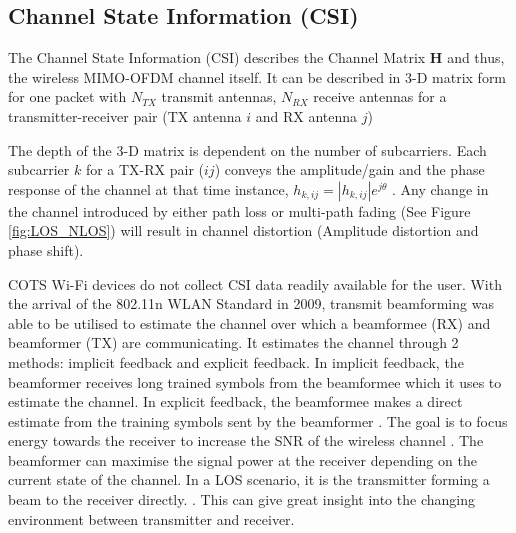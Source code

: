 \subsection{Channel State Information (CSI)}
The Channel State Information (CSI) describes the Channel Matrix \textbf{H} and thus, the wireless MIMO-OFDM channel itself. It can be described in 3-D matrix form for one packet with $N_{TX}$ transmit antennas, $N_{RX}$ receive antennas for a transmitter-receiver pair (TX antenna $i$ and RX antenna $j$) \par
The depth of the 3-D matrix is dependent on the number of subcarriers. Each subcarrier $k$ for a TX-RX pair ($ij$) conveys the amplitude/gain and the phase response of the channel at that time instance, $h_{k,ij} = |h_{k,ij}|e^{j\theta}$ \citep{OFDM}. Any change in the channel introduced by either path loss or multi-path fading (See Figure \ref{fig:LOS_NLOS}) will result in channel distortion (Amplitude distortion and phase shift).\par 
COTS Wi-Fi devices do not collect CSI data readily available for the user. With the arrival of the 802.11n WLAN Standard in 2009, transmit beamforming was able to be utilised to estimate the channel over which a beamformee (RX) and beamformer (TX) are communicating. It estimates the channel through 2 methods: implicit feedback and explicit feedback. In implicit feedback, the beamformer receives long trained symbols from the beamformee which it uses to estimate the channel. In explicit feedback, the beamformee makes a direct estimate from the training symbols sent by the beamformer \citep{full802.11nStandard}. The goal is to focus energy towards the receiver to increase the SNR of the wireless channel \citep{beamforming}. The beamformer can maximise the signal power at the receiver depending on the current state of the channel. In a LOS scenario, it is the transmitter forming a beam to the receiver directly. \citep{beamforming}. This can give great insight into the changing environment between transmitter and receiver. \par
